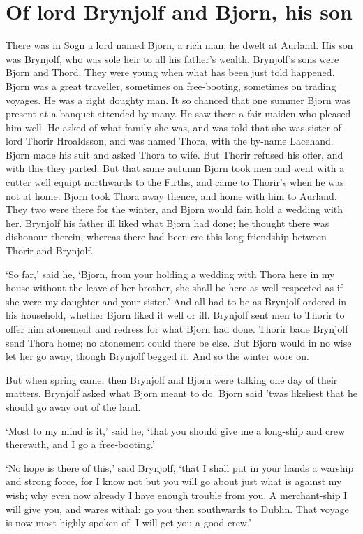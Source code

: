 \chapter{Of lord Brynjolf and Bjorn, his son}
There was in Sogn a lord named Bjorn, a rich man; he dwelt at Aurland. His son was Brynjolf, who was sole heir to all his father's wealth. Brynjolf's sons were Bjorn and Thord. They were young when what has been just told happened. Bjorn was a great traveller, sometimes on free-booting, sometimes on trading voyages. He was a right doughty man. It so chanced that one summer Bjorn was present at a banquet attended by many. He saw there a fair maiden who pleased him well. He asked of what family she was, and was told that she was sister of lord Thorir Hroaldsson, and was named Thora, with the by-name Lacehand. Bjorn made his suit and asked Thora to wife. But Thorir refused his offer, and with this they parted. But that same autumn Bjorn took men and went with a cutter well equipt northwards to the Firths, and came to Thorir's when he was not at home. Bjorn took Thora away thence, and home with him to Aurland. They two were there for the winter, and Bjorn would fain hold a wedding with her. Brynjolf his father ill liked what Bjorn had done; he thought there was dishonour therein, whereas there had been ere this long friendship between Thorir and Brynjolf.

`So far,' said he, `Bjorn, from your holding a wedding with Thora here in my house without the leave of her brother, she shall be here as well respected as if she were my daughter and your sister.' And all had to be as Brynjolf ordered in his household, whether Bjorn liked it well or ill. Brynjolf sent men to Thorir to offer him atonement and redress for what Bjorn had done. Thorir bade Brynjolf send Thora home; no atonement could there be else. But Bjorn would in no wise let her go away, though Brynjolf begged it. And so the winter wore on.

But when spring came, then Brynjolf and Bjorn were talking one day of their matters. Brynjolf asked what Bjorn meant to do. Bjorn said 'twas likeliest that he should go away out of the land.

`Most to my mind is it,' said he, `that you should give me a long-ship and crew therewith, and I go a free-booting.'

`No hope is there of this,' said Brynjolf, `that I shall put in your hands a warship and strong force, for I know not but you will go about just what is against my wish; why even now already I have enough trouble from you. A merchant-ship I will give you, and wares withal: go you then southwards to Dublin. That voyage is now most highly spoken of. I will get you a good crew.'

